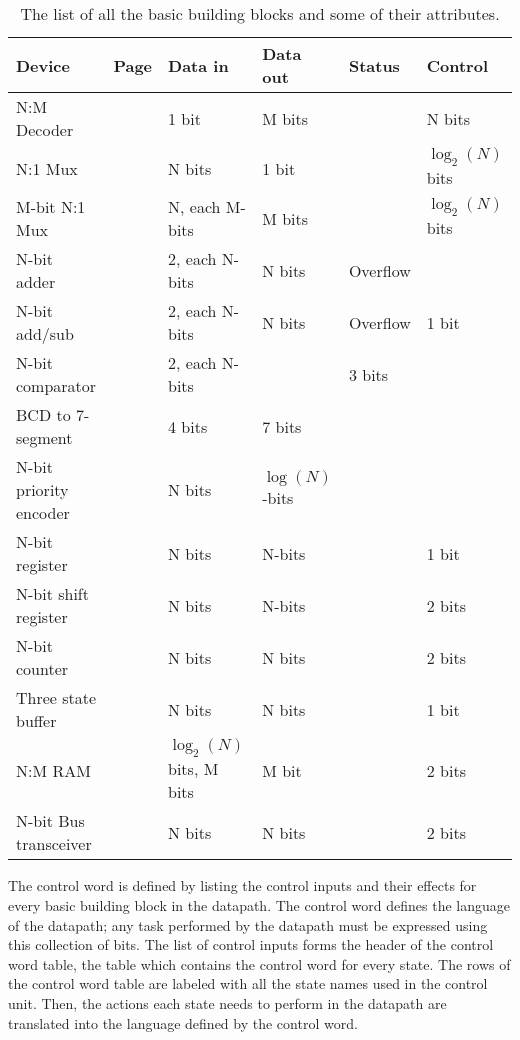 \begin{table}
{\small
\begin{tabular}{|l|l|l|l|l|l|} \hline
Device      & Page & Data in     & Data out & Status   & Control \\ \hline
N:M Decoder & \pageref{page:dec}          & 1 bit       & M bits  & 	& N bits  \\ \hline
N:1 Mux     & \pageref{page:mux}          & N bits  & 1 bit    & 	&  $\log_2(N)$ bits  \\ \hline
M-bit N:1 Mux   & \pageref{page:wmu}          & N, each M-bits  & M bits & 	&  $\log_2(N)$ bits  \\ \hline
N-bit adder & \pageref{page:add}          & 2, each N-bits & N bits & Overflow &   \\ \hline
N-bit add/sub & \pageref{page:as}         & 2, each N-bits & N bits & Overflow & 1 bit  \\ \hline
N-bit comparator & \pageref{page:com}     & 2, each N-bits &  & 3 bits &   \\ \hline
BCD to 7-segment & \pageref{page:7seg}  & 4 bits & 7 bits & &   \\ \hline
N-bit priority encoder & \pageref{page:prior}  & N bits & $\log(N)$-bits & &   \\ \hline
N-bit register & \pageref{page:reg}       & N bits & N-bits &  & 1 bit  \\ \hline
N-bit shift register & \pageref{page:shi} & N bits & N-bits &  & 2 bits  \\ \hline
N-bit counter & \pageref{page:counter}        & N bits & N bits &  & 2 bits  \\ \hline
Three state buffer& \pageref{page:tsb}      & N bits & N bits & & 1 bit  \\ \hline
N:M RAM & \pageref{page:ram}              & $\log_2(N)$ bits, M bits & M bit & & 2 bits  \\ \hline
N-bit Bus transceiver & \pageref{page:bus}      & N bits & N bits & & 2 bits \\ \hline
\end{tabular}
}
\caption{The list of all the basic building blocks and some of their attributes.}
\label{table:bbblist}
\end{table}
\label{page:boxlist}

The control word is defined by listing the control inputs and their effects
for every basic building block in the datapath.  The control word defines 
the language of the datapath; any task performed by the datapath must
be expressed using this collection of bits.  The list of control inputs
forms the header of the control word table, the table which 
contains the control word for every state.  The rows of the control word 
table are labeled with all the state names used in the control unit.  Then,
the actions each state needs to perform in the datapath are translated 
into the language defined by the control word.  

